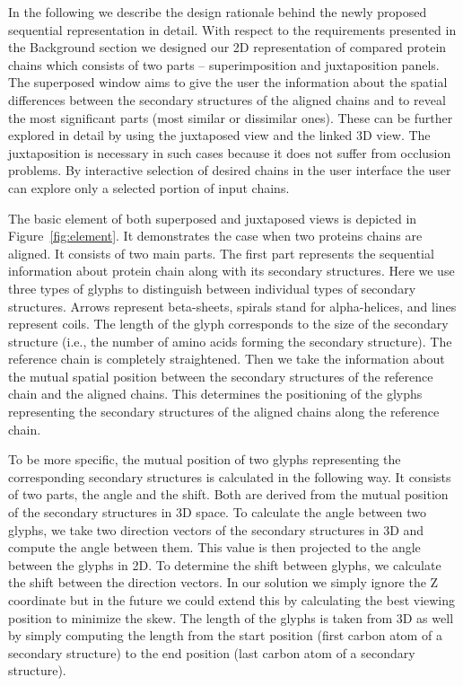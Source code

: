\documentclass[twocolumn]{bmcart}%
\begin{document}
In the following we describe the design rationale behind the newly proposed sequential representation in detail.
With respect to the requirements presented in the Background section we designed our 2D representation of compared protein chains which consists of two parts -- superimposition and juxtaposition panels.
The superposed window aims to give the user the information about the spatial differences between the secondary structures of the aligned chains and to reveal the most significant parts (most similar or dissimilar ones).
These can be further explored in detail by using the juxtaposed view and the linked 3D view.
The juxtaposition is necessary in such cases because it does not suffer from occlusion problems.
By interactive selection of desired chains in the user interface the user can explore only a selected portion of input chains.

The basic element of both superposed and juxtaposed views is depicted in Figure~\ref{fig:element}.
It demonstrates the case when two proteins chains are aligned.
It consists of two main parts.
The first part represents the sequential information about protein chain along with its secondary structures.
Here we use three types of glyphs to distinguish between individual types of secondary structures.
Arrows represent beta-sheets, spirals stand for alpha-helices, and lines represent coils.
The length of the glyph corresponds to the size of the secondary structure (i.e., the number of amino acids forming the secondary structure).
The reference chain is completely straightened.
Then we take the information about the mutual spatial position between the secondary structures of the reference chain and the aligned chains.
This determines the positioning of the glyphs representing the secondary structures of the aligned chains along the reference chain.

To be more specific, the mutual position of two glyphs representing the corresponding secondary structures is calculated in the following way.
It consists of two parts, the angle and the shift.
Both are derived from the mutual position of the secondary structures in 3D space.
To calculate the angle between two glyphs, we take two direction vectors of the secondary structures in 3D and compute the angle between them.
This value is then projected to the angle between the glyphs in 2D.
To determine the shift between glyphs, we calculate the shift between the direction vectors.
In our solution we simply ignore the Z coordinate but in the future we could extend this by calculating the best viewing position to minimize the skew.
The length of the glyphs is taken from 3D as well by simply computing the length from the start position (first carbon atom of a secondary structure) to the end position (last carbon atom of a secondary structure).
\end{document}
